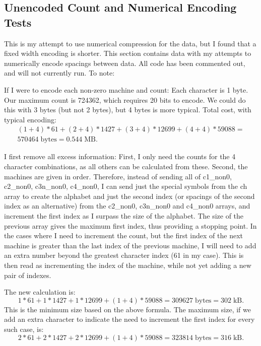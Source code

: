 \documentclass{article}
\begin{document}
\subsection{Unencoded Count and Numerical Encoding Tests}

This is my attempt to use numerical compression for the data, but I found that a fixed width encoding is shorter. This section contains data with my attempts to numerically encode spacings between data. All code has been commented out, and will not currently run. To note:

If I were to encode each non-zero machine and count: Each character is 1 byte. Our maximum count is 724362, which requires 20 bits to encode. We could do this with 3 bytes (but not 2 bytes), but 4 bytes is more typical. Total cost, with typical encoding:
\begin{gather*}
\left(1+4\right)* 61 + \left(2+4\right) * 1427 + \left(3+4\right) * 12699 + \left(4+4\right) * 59088 = \\
570464 \; \mathrm{bytes} = 0.544 \; \mathrm{MB}.
\end{gather*}

I first remove all excess information:
First, I only need the counts for the 4 character combinations, as all others can be calculated from these.
Second, the machines are given in order. Therefore, instead of sending all of c1\_non0, c2\_non0, c3n\_non0, c4\_non0, I can send just the special symbols from the ch array to create the alphabet and just the second index (or spacings of the second index as an alternative) from the c2\_non0, c3n\_non0 and c4\_non0 arrays, and increment the first index as I surpass the size of the alphabet. The size of the previous array gives the maximum first index, thus providing a stopping point. In the cases where I need to increment the count, but the first index of the next machine is greater than the last index of the previous machine, I will need to add an extra number beyond the greatest character index (61 in my case). This is then read as incrementing the index of the machine, while not yet adding a new pair of indexes.

The new calculation is:
\begin{equation*}
1* 61 + 1*1427 + 1*12699 + \left(1+4\right) * 59088 = 309627 \; \mathrm{bytes} = 302 \; \mathrm{kB}. 
\end{equation*}
This is the minimum size based on the above formula. The maximum size, if we add an extra character to indicate the need to increment the first index for every such case, is:
\begin{equation*}
2*61+2*1427+2*12699 + \left(1+4\right)*59088 = 323814\; \mathrm{bytes} = 316 \; \mathrm{kB}. 
\end{equation*}
\end{document}
